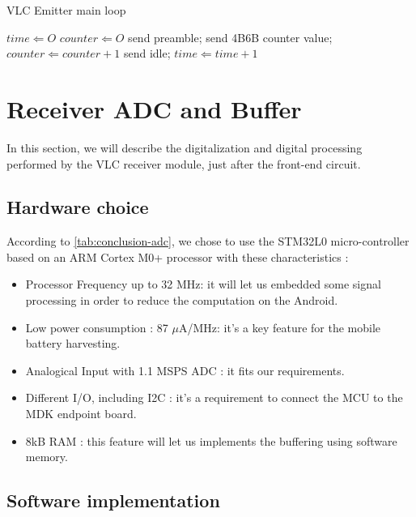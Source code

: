 \begin{algorithm}\label{alg:emitter}

\caption{VLC Emitter main loop}

\begin{algorithmic}
    \State $time \Leftarrow O$
    \State $counter \Leftarrow O$
          \State send preamble;
          \State send 4B6B counter value;
          \State $counter \Leftarrow counter+1$
      \Else
          \State send idle;
    \EndIf
    \State $time \Leftarrow time+1$
    \EndWhile
\end{algorithmic}
\end{algorithm}


\section{Receiver ADC and Buffer}
In this section, we will describe the digitalization and digital processing performed by the VLC receiver module, just  after the front-end circuit.

\subsection{Hardware choice}

According to \ref{tab:conclusion-adc}, we chose to use the STM32L0 micro-controller based on an ARM Cortex  M0+ processor with these characteristics :
\begin{itemize}
\item Processor Frequency up to 32 MHz: it will let us embedded some signal processing in order to reduce the computation on the Android.
\item Low power consumption : 87 $\mu$A/MHz: it's a key feature for the mobile battery harvesting.
\item Analogical Input with 1.1 MSPS ADC : it fits our requirements.
\item Different I/O, including I2C : it's a requirement to connect the MCU to the MDK endpoint board.
\item 8kB RAM : this feature will let us implements the buffering using software memory.
\end{itemize}

\subsection{Software implementation}

